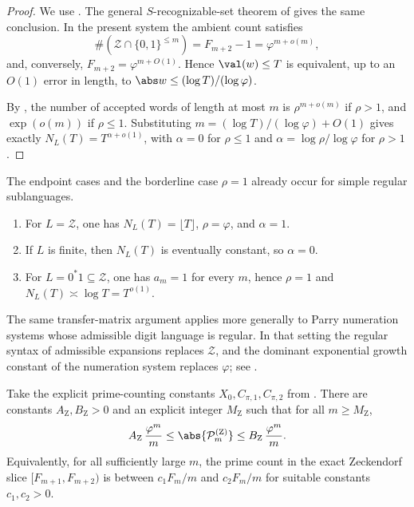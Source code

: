 \begin{proof}
  We use . The general
  \(S\)-recognizable-set theorem of
  \cite[Theorem~7]{CharlierRampersad2011} gives the same conclusion. In
  the present system the ambient count satisfies
  \[
    \#(\mathcal Z\cap\{0,1\}^{\le m})
    =F_{m+2}-1
    =\varphi^{m+o(m)},
  \]
  and, conversely, \(F_{m+2}=\varphi^{m+O(1)}\). Hence
  \(\val(w)\le T\) is equivalent, up to an \(O(1)\) error in length, to
  \(\abs w\le (\log T)/(\log\varphi)\).

  By ,
  the number of accepted words of length at most \(m\) is
  \(\rho^{m+o(m)}\) if \(\rho>1\), and \(\exp(o(m))\) if \(\rho\le1\).
  Substituting \(m=(\log T)/(\log\varphi)+O(1)\) gives exactly
  \(N_L(T)=T^{\alpha+o(1)}\), with \(\alpha=0\) for \(\rho\le1\) and
  \(\alpha=\log\rho/\log\varphi\) for \(\rho>1\).
\end{proof}

\begin{remark}\label{rem:zeckendorf-examples}
  The endpoint cases and the borderline case \(\rho=1\) already occur
  for simple regular sublanguages.
  \begin{enumerate}[label=\textup{(\roman*)}]
    \item For \(L=\mathcal Z\), one has \(N_L(T)=\lfloor T\rfloor\),
    \(\rho=\varphi\), and \(\alpha=1\).
    \item If \(L\) is finite, then \(N_L(T)\) is eventually constant,
    so \(\alpha=0\).
    \item For \(L=0^\ast1\subseteq\mathcal Z\), one has \(a_m=1\) for
    every \(m\), hence \(\rho=1\) and
    \(N_L(T)\asymp \log T=T^{o(1)}\).
  \end{enumerate}
\end{remark}

\begin{remark}
  The same transfer-matrix argument applies more generally to Parry
  numeration systems whose admissible digit language is regular. In that
  setting the regular syntax of admissible expansions replaces
  \(\mathcal Z\), and the dominant exponential growth constant of the
  numeration system replaces \(\varphi\); see
  \cite{Frougny1992,BruyereHansel1997,LecomteRigo2001,Rigo2014Vol1,Rigo2014Vol2}.
\end{remark}

\begin{lemma}
  \label{lem:zeck-prime-count}
  Take the explicit prime-counting constants
  \(X_0,C_{\pi,1},C_{\pi,2}\) from . There are constants
  \(A_{\mathrm Z},B_{\mathrm Z}>0\) and an explicit integer \(M_{\mathrm Z}\)
  such that for all \(m\ge M_{\mathrm Z}\),
  \[
    A_{\mathrm Z}\,\frac{\varphi^m}{m}
    \le \abs{\mathcal P_m^{(\mathrm Z)}}
    \le B_{\mathrm Z}\,\frac{\varphi^m}{m}.
  \]
  Equivalently, for all sufficiently large \(m\), the prime count in
  the exact Zeckendorf slice \([F_{m+1},F_{m+2})\) is between
  \(c_1F_m/m\) and \(c_2F_m/m\) for suitable constants
  \(c_1,c_2>0\).
\end{lemma}


